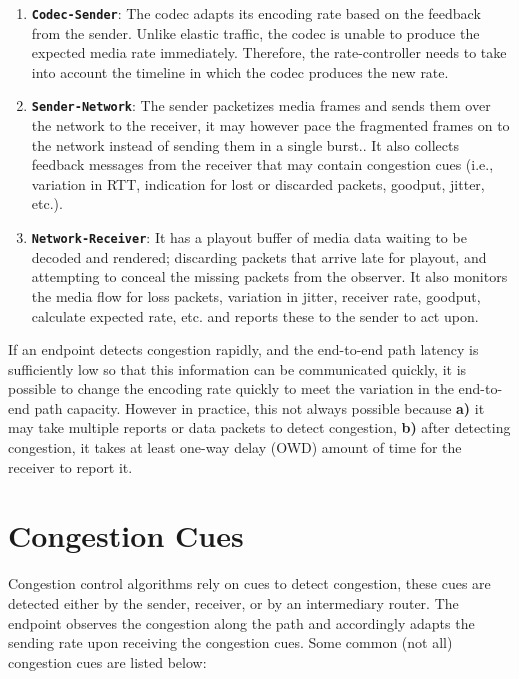 \begin{enumerate}
\setlength{\itemsep}{0pt}

\item \textbf{\texttt{Codec-Sender}}: The codec adapts its encoding rate based
on the feedback from the sender. Unlike elastic traffic, the codec is unable
to produce the expected media rate immediately. Therefore, the rate-controller
needs to take into account the timeline in which the codec produces the new
rate.

\item \textbf{\texttt{Sender-Network}}: The sender packetizes media frames and
sends them over the network to the receiver, it may however pace the
fragmented frames on to the network instead of sending them in a single
burst.. It also collects feedback messages from the receiver that may contain
congestion cues (i.e., variation in RTT, indication for lost or discarded
packets, goodput, jitter, etc.).

\item \textbf{\texttt{Network-Receiver}}: It has a playout buffer of media
data waiting to be decoded and rendered; discarding packets that arrive late
for playout, and attempting to conceal the missing packets from the observer.
It also monitors the media flow for loss packets, variation in jitter,
receiver rate, goodput, calculate expected rate, etc. and reports these to the
sender to act upon.

\end{enumerate}

If an endpoint detects congestion rapidly, and the end-to-end path latency is
sufficiently low so that this information can be communicated quickly, it is
possible to change the encoding rate quickly to meet the variation in the 
end-to-end path capacity. However in practice, this not always possible because
\textbf{a)} it may take multiple reports or data packets to detect congestion,
\textbf{b)} after detecting congestion, it takes at least one-way delay (OWD)
amount of time for the receiver to report it.


\section{Congestion Cues}
\label{fw.cues}

Congestion control algorithms rely on cues to detect congestion, these cues
are detected either by the sender, receiver, or by an intermediary router. The
endpoint observes the congestion along the path and accordingly adapts the
sending rate upon receiving the congestion cues. Some common (not all)
congestion cues are listed below:

